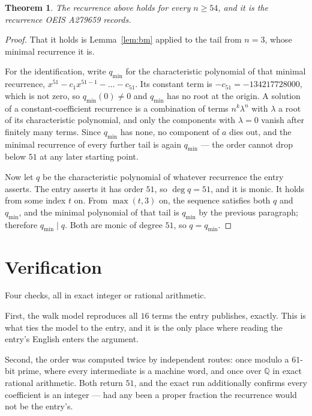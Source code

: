 \documentclass[11pt,a4paper]{article}
\theoremstyle{plain}
\newtheorem{theorem}{Theorem}
\theoremstyle{definition}
\begin{document}
\begin{theorem}
The recurrence above holds for every $n\ge54$, and it is the recurrence OEIS A279659 records.
\end{theorem}

\begin{proof}
That it holds is Lemma~\ref{lem:bm} applied to the tail from $n=3$, whose minimal
recurrence it is.

For the identification, write $q_{\min}$ for the characteristic polynomial of that minimal
recurrence, $x^{51}-c_1x^{51-1}-\dots-c_{51}$. Its constant term is
$-c_{51}=-134217728000$, which is not zero, so $q_{\min}(0)\neq0$ and $q_{\min}$ has no
root at the origin. A solution of a constant-coefficient recurrence is a combination of terms
$n^{k}\lambda^{n}$ with $\lambda$ a root of its characteristic polynomial, and only the
components with $\lambda=0$ vanish after finitely many terms. Since $q_{\min}$ has none, no
component of $a$ dies out, and the minimal recurrence of every further tail is again
$q_{\min}$ --- the order cannot drop below $51$ at any later starting point.

Now let $q$ be the characteristic polynomial of whatever recurrence the entry asserts. The
entry asserts it has order $51$, so $\deg q=51$, and it is monic. It holds from some
index $t$ on. From $\max(t,3)$ on, the sequence satisfies both $q$ and $q_{\min}$, and
the minimal polynomial of that tail is $q_{\min}$ by the previous paragraph; therefore
$q_{\min}\mid q$. Both are monic of degree $51$, so $q=q_{\min}$.
\end{proof}

\section{Verification}

Four checks, all in exact integer or rational arithmetic.

First, the walk model reproduces all $16$ terms the entry publishes, exactly. This is
what ties the model to the entry, and it is the only place where reading the entry's English
enters the argument.

Second, the order was computed twice by independent routes: once modulo a $61$-bit prime, where
every intermediate is a machine word, and once over $\mathbb{Q}$ in exact rational arithmetic.
Both return $51$, and the exact run additionally confirms every coefficient is an integer
--- had any been a proper fraction the recurrence would not be the entry's.
\end{document}
